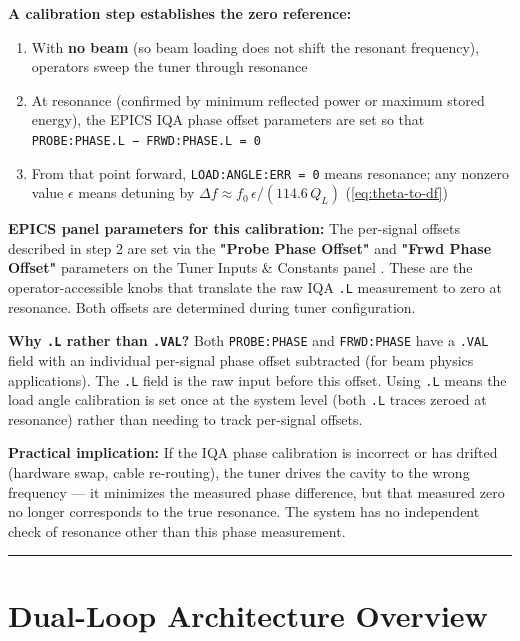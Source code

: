 \textbf{A calibration step establishes the zero reference:}

\begin{enumerate}
\def\labelenumi{\arabic{enumi}.}
\tightlist
\item
  With \textbf{no beam} (so beam loading does not shift the resonant frequency), operators sweep the tuner through resonance
\item
  At resonance (confirmed by minimum reflected power or maximum stored energy), the EPICS IQA phase offset parameters are set so that \texttt{PROBE:\allowbreak{}PHASE.\allowbreak{}L\ −\ FRWD:\allowbreak{}PHASE.\allowbreak{}L\ =\allowbreak{}\ 0}
\item
  From that point forward, \texttt{LOAD:\allowbreak{}ANGLE:\allowbreak{}ERR\ =\allowbreak{}\ 0} means resonance; any nonzero value \(\epsilon\) means detuning by \(\Delta f \approx f_0\,\epsilon/(114.6\,Q_L)\) (\cref{eq:theta-to-df})
\end{enumerate}

\textbf{EPICS panel parameters for this calibration:} The per-signal offsets described in step 2 are set via the \textbf{"Probe Phase Offset"} and \textbf{"Frwd Phase Offset"} parameters on the Tuner Inputs \& Constants panel . These are the operator-accessible knobs that translate the raw IQA \texttt{.L} measurement to zero at resonance. Both offsets are determined during tuner configuration.

\textbf{Why \texttt{.L} rather than \texttt{.VAL}?} Both \texttt{PROBE:PHASE} and \texttt{FRWD:PHASE} have a \texttt{.VAL} field with an individual per-signal phase offset subtracted (for beam physics applications). The \texttt{.L} field is the raw input before this offset. Using \texttt{.L} means the load angle calibration is set once at the system level (both \texttt{.L} traces zeroed at resonance) rather than needing to track per-signal offsets.

\textbf{Practical implication:} If the IQA phase calibration is incorrect or has drifted (hardware swap, cable re-routing), the tuner drives the cavity to the wrong frequency --- it minimizes the measured phase difference, but that measured zero no longer corresponds to the true resonance. The system has no independent check of resonance other than this phase measurement.

\begin{center}\rule{0.5\linewidth}{0.5pt}\end{center}

\section{Dual-Loop Architecture Overview}\label{sec:architecture}

